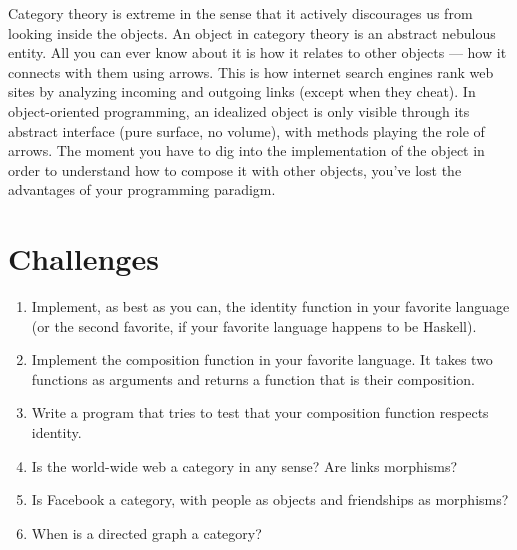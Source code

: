 Category theory is extreme in the sense that it actively discourages us
from looking inside the objects. An object in category theory is an
abstract nebulous entity. All you can ever know about it is how it
relates to other objects --- how it connects with them using arrows. This
is how internet search engines rank web sites by analyzing incoming and
outgoing links (except when they cheat). In object-oriented programming,
an idealized object is only visible through its abstract interface (pure
surface, no volume), with methods playing the role of arrows. The moment
you have to dig into the implementation of the object in order to
understand how to compose it with other objects, you've lost the
advantages of your programming paradigm.

\section{Challenges}

\begin{enumerate}
  \tightlist
  \item
        Implement, as best as you can, the identity function in your favorite
        language (or the second favorite, if your favorite language happens to
        be Haskell).
  \item
        Implement the composition function in your favorite language. It takes
        two functions as arguments and returns a function that is their
        composition.
  \item
        Write a program that tries to test that your composition function
        respects identity.
  \item
        Is the world-wide web a category in any sense? Are links morphisms?
  \item
        Is Facebook a category, with people as objects and friendships as
        morphisms?
  \item
        When is a directed graph a category?
\end{enumerate}
